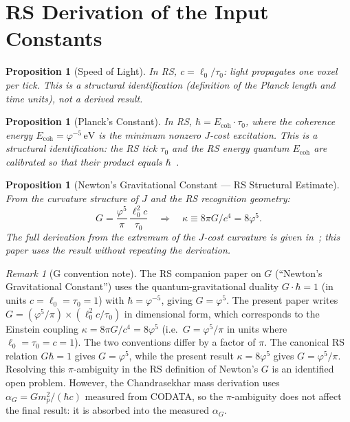 \documentclass[12pt,a4paper]{article}
\newtheorem{proposition}[theorem]{Proposition}
\theoremstyle{definition}
\theoremstyle{remark}
\newtheorem{remark}[theorem]{Remark}
\begin{document}
\section{RS Derivation of the Input Constants}
\label{sec:constants}

\begin{proposition}[Speed of Light]
\label{thm:c}
In RS, $c = \ell_0/\tau_0$: light propagates one voxel per tick.
This is a structural identification (definition of the Planck
length and time units), not a derived result.
\end{proposition}

\begin{proposition}[Planck's Constant]
\label{thm:hbar}
In RS, $\hbar = E_{\mathrm{coh}} \cdot \tau_0$, where the coherence
energy $E_{\mathrm{coh}} = \varphi^{-5}\,\mathrm{eV}$ is the minimum
nonzero $J$-cost excitation.  This is a structural identification:
the RS tick $\tau_0$ and the RS energy quantum $E_{\mathrm{coh}}$
are calibrated so that their product equals $\hbar$~\cite{RS_Axioms}.
\end{proposition}

\begin{proposition}[Newton's Gravitational Constant --- RS Structural Estimate]
\label{thm:G}
From the curvature structure of $J$ and the RS recognition geometry:
\begin{equation}
  G = \frac{\varphi^5}{\pi}\,
  \frac{\ell_0^2 c}{\tau_0}
  \quad \Longrightarrow \quad
  \kappa \equiv 8\pi G/c^4 = 8\varphi^5.
\end{equation}
The full derivation from the extremum of the $J$-cost curvature is
given in~\cite{RS_Axioms}; this paper uses the result without
repeating the derivation.
\end{proposition}

\begin{remark}[G convention note]
\label{rem:G-convention}
The RS companion paper on $G$ (``Newton's Gravitational Constant'')
uses the quantum-gravitational duality $G \cdot \hbar = 1$ (in units
$c = \ell_0 = \tau_0 = 1$) with $\hbar = \varphi^{-5}$, giving
$G = \varphi^5$.  The present paper writes $G = (\varphi^5/\pi)
\times (\ell_0^2 c/\tau_0)$ in dimensional form, which corresponds
to the Einstein coupling $\kappa = 8\pi G/c^4 = 8\varphi^5$ (i.e.\
$G = \varphi^5/\pi$ in units where $\ell_0 = \tau_0 = c = 1$).
The two conventions differ by a factor of $\pi$.  The canonical RS
relation $G\hbar = 1$ gives $G = \varphi^5$, while the present
result $\kappa = 8\varphi^5$ gives $G = \varphi^5/\pi$.  Resolving
this $\pi$-ambiguity in the RS definition of Newton's $G$ is an
identified open problem.  However, the Chandrasekhar mass derivation
uses $\alpha_G = G m_p^2/(\hbar c)$ measured from CODATA, so the
$\pi$-ambiguity does not affect the final result: it is absorbed into
the measured $\alpha_G$.
\end{remark}
\end{document}
